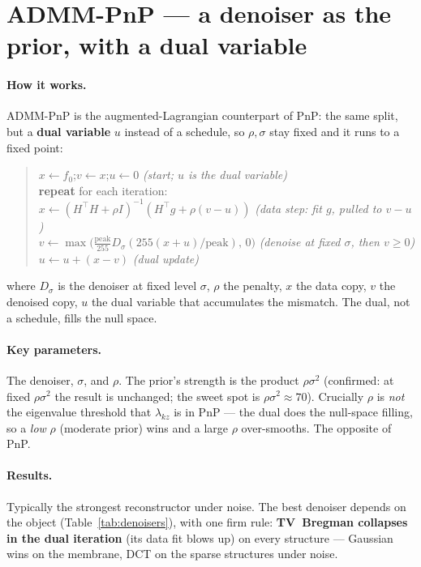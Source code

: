 \section{ADMM-PnP --- a denoiser as the prior, with a dual variable}
\label{sec:admm_pnp}

\paragraph{How it works.}
ADMM-PnP is the augmented-Lagrangian counterpart of PnP: the same split, but a \textbf{dual
variable} $u$ instead of a schedule, so $\rho,\sigma$ stay fixed and it runs to a fixed point:
\begin{quote}
$x \leftarrow f_0$;\quad $v \leftarrow x$;\quad $u \leftarrow 0$ \hfill\textit{(start; $u$ is the dual variable)}\\
\textbf{repeat} for each iteration:\\
\hspace{1.2em}$x \leftarrow (H^{\!\top}\!H+\rho I)^{-1}(H^{\!\top} g + \rho(v-u))$ \hfill\textit{(data step: fit $g$, pulled to $v-u$)}\\
\hspace{1.2em}$v \leftarrow \max\!\big(\tfrac{\text{peak}}{255}D_\sigma(255(x+u)/\text{peak}),\,0\big)$ \hfill\textit{(denoise at fixed $\sigma$, then $v\ge0$)}\\
\hspace{1.2em}$u \leftarrow u + (x-v)$ \hfill\textit{(dual update)}
\end{quote}
\noindent where $D_\sigma$ is the denoiser at fixed level $\sigma$, $\rho$ the penalty, $x$ the data
copy, $v$ the denoised copy, $u$ the dual variable that accumulates the mismatch. The dual, not a
schedule, fills the null space.

\paragraph{Key parameters.}
The denoiser, $\sigma$, and $\rho$. The prior's strength is the product $\rho\sigma^2$ (confirmed:
at fixed $\rho\sigma^2$ the result is unchanged; the sweet spot is $\rho\sigma^2\approx70$).
Crucially $\rho$ is \emph{not} the eigenvalue threshold that $\lambda_{kz}$ is in PnP --- the dual
does the null-space filling, so a \emph{low} $\rho$ (moderate prior) wins and a large $\rho$
over-smooths. The opposite of PnP.

\paragraph{Results.}
Typically the strongest reconstructor under noise. The best denoiser depends on the object
(Table~\ref{tab:denoisers}), with one firm rule: \textbf{TV~Bregman collapses in the dual
iteration} (its data fit blows up) on every structure --- Gaussian wins on the membrane, DCT on the
sparse structures under noise.

